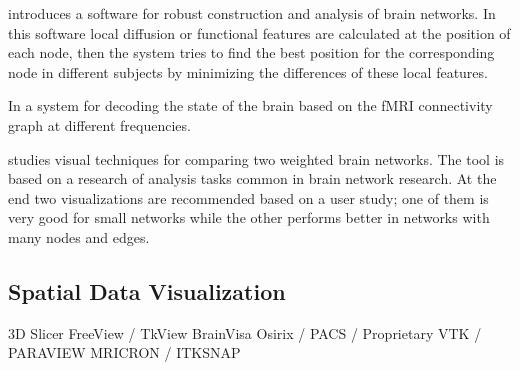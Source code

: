 \autocite{li_visual_2012} introduces a software for robust construction and analysis of brain networks. In this software local diffusion or functional features are calculated at the position of each node, then the system tries to find the best position for the corresponding node in different subjects by minimizing the differences of these local features.

In \autocite{richiardi_decoding_2011} a system for decoding the state of the brain based on the fMRI connectivity graph at different frequencies.

\autocite{alper_weighted_2013} studies visual techniques for comparing two weighted brain networks. The tool is based on a research of analysis tasks common in brain network research. At the end two visualizations are recommended based on a user study; one of them is very good for small networks while the other performs better in networks with many nodes and edges.

\subsection{Spatial Data Visualization}

3D Slicer
FreeView / TkView
BrainVisa
Osirix / PACS / Proprietary
VTK / PARAVIEW
MRICRON / ITKSNAP









